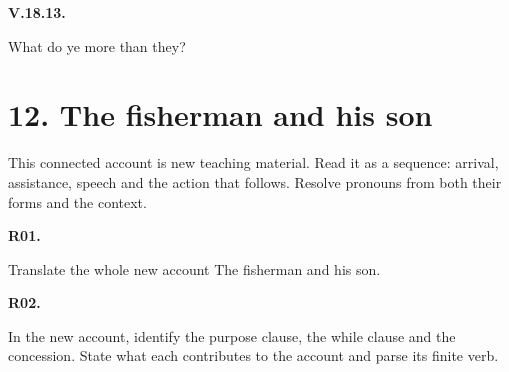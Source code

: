 \par\begin{minipage}{\linewidth}\raggedright
\textbf{V.18.13.}

What do ye more than they?

\end{minipage}\par\addvspace{4pt}

\section*{12. The fisherman and his son}

This connected account is new teaching material. Read it as a sequence: arrival, assistance, speech and the action that follows. Resolve pronouns from both their forms and the context.

\par\begin{minipage}{\linewidth}\raggedright
{}
\end{minipage}\par

\par\begin{minipage}{\linewidth}\raggedright
\textbf{R01.}

Translate the whole new account The fisherman and his son.

\end{minipage}\par\addvspace{4pt}

\par\begin{minipage}{\linewidth}\raggedright
\textbf{R02.}

In the new account, identify the purpose clause, the while clause and the concession. State what each contributes to the account and parse its finite verb.

\end{minipage}\par\addvspace{4pt}

